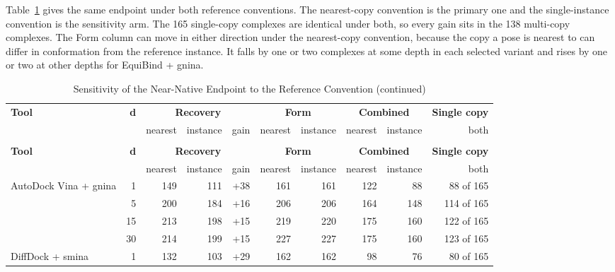 Table~\ref{tab:reference_convention_sensitivity} gives the same endpoint under both reference conventions. The nearest-copy convention is the primary one and the single-instance convention is the sensitivity arm. The 165 single-copy complexes are identical under both, so every gain sits in the 138 multi-copy complexes. The Form column can move in either direction under the nearest-copy convention, because the copy a pose is nearest to can differ in conformation from the reference instance. It falls by one or two complexes at some depth in each selected variant and rises by one or two at other depths for EquiBind + gnina.

\begingroup
\scriptsize
\setlength{\tabcolsep}{3pt}
\begin{longtable}[]{@{}lrrrrrrrrr@{}}
\caption[Sensitivity of the validity-aware recovery endpoint to the reference convention]{Sensitivity of the Validity-Aware Recovery Endpoint to the Reference Convention}\label{tab:reference_convention_sensitivity}\tabularnewline
\toprule\noalign{}
{\raggedright \textbf{Tool}} & \textbf{d} & \multicolumn{3}{c}{\textbf{Recovery}} & \multicolumn{2}{c}{\textbf{Form}} & \multicolumn{2}{c}{\textbf{Combined}} & \textbf{Single copy} \\
\cmidrule(lr){3-5}\cmidrule(lr){6-7}\cmidrule(lr){8-9}\cmidrule(lr){10-10}
 & & nearest & instance & gain & nearest & instance & nearest & instance & both \\
\midrule\noalign{}
\endfirsthead
\caption[]{Sensitivity of the Near-Native Endpoint to the Reference Convention (continued)}\tabularnewline
\toprule\noalign{}
{\raggedright \textbf{Tool}} & \textbf{d} & \multicolumn{3}{c}{\textbf{Recovery}} & \multicolumn{2}{c}{\textbf{Form}} & \multicolumn{2}{c}{\textbf{Combined}} & \textbf{Single copy} \\
\cmidrule(lr){3-5}\cmidrule(lr){6-7}\cmidrule(lr){8-9}\cmidrule(lr){10-10}
 & & nearest & instance & gain & nearest & instance & nearest & instance & both \\
\midrule\noalign{}
\endhead
\bottomrule\noalign{}
\endlastfoot
AutoDock Vina + gnina & 1 & 149 & 111 & +38 & 161 & 161 & 122 & 88 & 88 of 165 \\
 & 5 & 200 & 184 & +16 & 206 & 206 & 164 & 148 & 114 of 165 \\
 & 15 & 213 & 198 & +15 & 219 & 220 & 175 & 160 & 122 of 165 \\
 & 30 & 214 & 199 & +15 & 227 & 227 & 175 & 160 & 123 of 165 \\
DiffDock + smina & 1 & 132 & 103 & +29 & 162 & 162 & 98 & 76 & 80 of 165 \\

\end{longtable}
